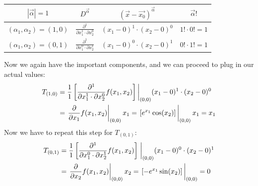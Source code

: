 \begin{table}[h!]
	\centering
	\renewcommand{\arraystretch}{1.5} 
	\begin{tabular}{cccc}
		\hline
		$|\vec{\alpha}|=1$ & $D^{\vec{\alpha}}$ & $\left(\vec{x}-\vec{x_0}\right)^{\vec{\alpha}}$& $\vec{\alpha}!$\\
		\hline
		$(\alpha_1, \alpha_2)=(1, 0)$&$\frac{\partial^1}{\partial x_1^{1}\cdot \partial x_2^{0}}$& $(x_1-0)^1\cdot(x_2-0)^0$ & $1!\cdot 0! = 1$\\
		$(\alpha_1, \alpha_2)=(0, 1)$&$\frac{\partial^1}{\partial x_1^{0}\cdot \partial x_2^{1}}$& $(x_1-0)^0\cdot(x_2-0)^1$ &$0!\cdot 1! = 1$
	\end{tabular}
	\label{tab:taylor_example_2}
\end{table}
Now we again have the important components, and we can proceed to plug in our actual values: 
\begin{align}
	T_{(1,0)}&=\frac{1}{1}\left[\frac{\partial^1}{\partial x_1^{1}\cdot \partial x_2^{0}}f(x_1, x_2)\right]\bigg{|}_{(0,0)}(x_1-0)^1\cdot(x_2-0)^0\\
	&=\eval{\frac{\partial}{\partial x_1}f(x_1,x_2)}_{(0,0)}x_1= \eval{\left[e^{x_1} \cos(x_2)\right]}_{(0,0)}x_1= x_1
\end{align}
Now we have to repeat this step for $T_{(0,1)}$:
\begin{align}
	T_{(0,1)}&=\frac{1}{1}\left[\frac{\partial^1}{\partial x_1^{0}\cdot \partial x_2^{1}}f(x_1, x_2)\right]\eval_{(0,0)}(x_1-0)^0\cdot(x_2-0)^1\\
	&=\eval{\frac{\partial}{\partial x_2}f(x_1,x_2)}_{(0,0)}x_2= \eval{\left[-e^{x_1} \sin(x_2)\right]}_{(0,0)}= 0
\end{align}

